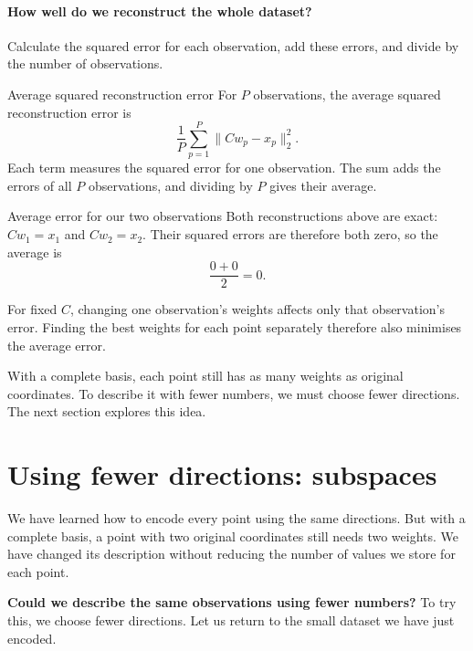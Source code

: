 \documentclass[a4paper,12pt,oneside]{report}
\begin{document}
\paragraph{How well do we reconstruct the whole dataset?}
Calculate the squared error for each observation, add these errors,
and divide by the number of observations.

\begin{frameddefn}{Average squared reconstruction error}
For $P$ observations, the average squared reconstruction error is
\[
  \frac{1}{P}\sum_{p=1}^{P}\lVert Cw_p-x_p\rVert_2^2.
\]
Each term measures the squared error for one observation. The sum
adds the errors of all $P$ observations, and dividing by $P$ gives
their average.
\end{frameddefn}

\begin{framedexample}{Average error for our two observations}
Both reconstructions above are exact: $Cw_1=x_1$ and $Cw_2=x_2$.
Their squared errors are therefore both zero, so the average is
\[
  \frac{0+0}{2}=0.
\]
\end{framedexample}

For fixed $C$, changing one observation's weights affects only that
observation's error. Finding the best weights for each point
separately therefore also minimises the average error.

With a complete basis, each point still has as many weights as
original coordinates. To describe it with fewer numbers, we must
choose fewer directions. The next section explores this idea.

\clearpage
\section{Using fewer directions: subspaces}

We have learned how to encode every point using the same directions.
But with a complete basis, a point with two original coordinates
still needs two weights. We have changed its description without
reducing the number of values we store for each point.

\textbf{Could we describe the same observations using fewer numbers?}
To try this, we choose fewer directions. Let us return to the small
dataset we have just encoded.
\end{document}
